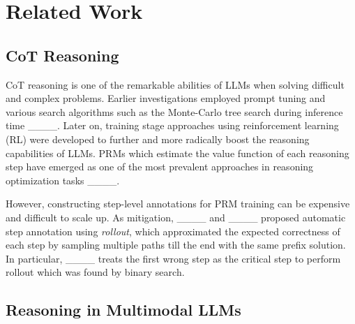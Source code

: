 \section{Related Work}
\subsection{CoT Reasoning}
CoT reasoning is one of the remarkable abilities of LLMs when solving difficult and complex problems. Earlier investigations employed prompt tuning and various search algorithms such as the Monte-Carlo tree search during inference time ____. Later on, training stage approaches using reinforcement learning (RL) were developed to further and more radically boost the reasoning capabilities of LLMs. PRMs which estimate the value function of each reasoning step have emerged as one of the most prevalent approaches in reasoning optimization tasks ____. 

However, constructing step-level annotations for PRM training can be expensive and difficult to scale up. As mitigation, ____ and ____ proposed automatic step annotation using \textit{rollout}, which approximated the expected correctness of each step by sampling multiple paths till the end with the same prefix solution. In particular, ____ treats the first wrong step as the critical step to perform rollout which was found by binary search. 

\subsection{Reasoning in Multimodal LLMs}



